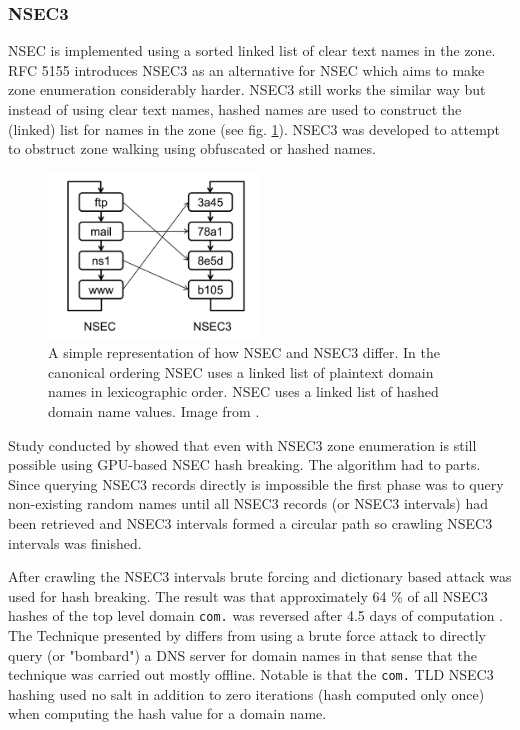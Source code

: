 \subsubsection{NSEC3}
\label{sec:nsec3}
NSEC is implemented using a sorted linked list of clear text names in the zone.
RFC 5155 \cite{RFC5155} introduces NSEC3 as an alternative for NSEC which aims to make zone enumeration considerably harder. NSEC3 still works the similar way but instead of using clear text names, hashed names are used to construct the (linked) list for names in the zone (see fig. \ref{fig:hash_list}). NSEC3 was developed to attempt to obstruct zone walking using obfuscated or hashed names.


\begin{figure}[htb]
  \begin{center}
    \includegraphics[width=0.5\textwidth]{nsec3.png}
    \caption{A simple representation of how NSEC and NSEC3 differ. In the canonical ordering NSEC uses a linked list of plaintext domain names in lexicographic order. NSEC uses a linked list of hashed domain name values. Image from \cite{NSEC3_hash_breaking}.} 
    \label{fig:hash_list}
  \end{center}
\end{figure}

Study conducted by \citet{NSEC3_hash_breaking} showed that even with NSEC3 zone enumeration is still possible using GPU-based NSEC hash breaking. The algorithm had to parts. Since querying NSEC3 records directly is impossible the first phase was to query non-existing random names until all NSEC3 records (or NSEC3 intervals) had been retrieved and NSEC3 intervals formed a circular path so crawling NSEC3 intervals was finished.


After crawling the NSEC3 intervals brute forcing and dictionary based attack was used for hash breaking. The result was that approximately 64 \% of all NSEC3 hashes of the top level domain \texttt{com.} was reversed after 4.5 days of computation \cite{NSEC3_hash_breaking}. The Technique presented by \citet{NSEC3_hash_breaking} differs from using a brute force attack to directly query (or "bombard") a DNS server for domain names in that sense that the technique was carried out mostly offline. Notable is that the \texttt{com.} TLD NSEC3 hashing  used no salt in addition to zero iterations (hash computed only once) when computing the hash value for a domain name.

